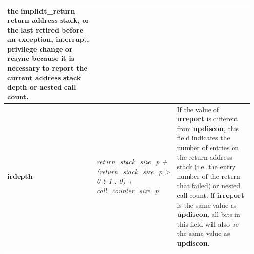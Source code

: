 \begin{table}[htp]
\begin{tabulary}{\textwidth}{|l|p{35mm}|p{90mm}|}
                the implicit\_return return address stack, or \newline
                the last retired before an exception, interrupt, privilege change or resync because it is necessary to report 
                the current address stack depth or nested call count. \\
    \hline
    \textbf{irdepth}	& \textit {return\_stack\_size\_p + (return\_stack\_size\_p > 0 ? 1 : 0) + call\_counter\_size\_p} & 
                If the value of \textbf{irreport} is different from \textbf{updiscon}, this field 
		indicates the number of entries on the return address stack (i.e. the entry number of the return that
                failed) or nested call count.  If \textbf{irreport} is the same value as \textbf{updiscon}, 
                all bits in this field  will also be the same value as \textbf{updiscon}. \\
    \hline
  \end{tabulary}
\end{table}


